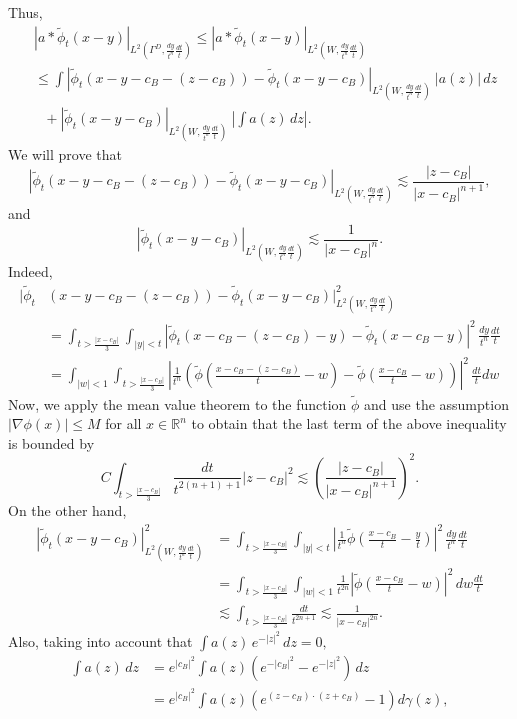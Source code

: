 \documentclass[leqno,11pt]{amsart}
\theoremstyle{plain}
\theoremstyle{remark}
\begin{document}
{{Thus,
\begin{align*}
&|a\ast \widetilde{\phi}_t(x-y)|_{L^2(\Gamma^D, \frac{dy}{t^n}\frac{dt}{t})} \le |a\ast \widetilde{\phi}_t(x-y)|_{L^2(W, \frac{dy}{t^n}\frac{dt}{t})}\\ & \le \int |\widetilde{\phi}_t(x-y-c_B-(z-c_B))-\widetilde{\phi}_t(x-y-c_B)|_{L^2(W, \frac{dy}{t^n}\frac{dt}{t})}\ |a(z)|\, dz\\ &\ \ \ + |\widetilde{\phi}_t(x-y-c_B)|_{L^2(W, \frac{dy}{t^n}\frac{dt}{t})}\ \left|\int a(z)\, dz\right|.
\end{align*}
We will prove that $$|\widetilde{\phi}_t(x-y-c_B-(z-c_B))-\widetilde{\phi}_t(x-y-c_B)|_{L^2(W, \frac{dy}{t^n}\frac{dt}{t})}\lesssim \frac{|z-c_B|}{|x-c_B|^{n+1}},$$ and $$|\widetilde{\phi}_t(x-y-c_B)|_{L^2(W, \frac{dy}{t^n}\frac{dt}{t})}\lesssim \frac{1}{|x-c_B|^n}.$$
Indeed,
\begin{align*}
|\widetilde{\phi}_t&(x-y-c_B-(z-c_B))-\widetilde{\phi}_t(x-y-c_B)|^2_{L^2(W, \frac{dy}{t^n}\frac{dt}{t})}\\ &=\int_{t>\frac{|x-c_B|}{3}}\int_{|y|<t}|\widetilde{\phi}_t(x-c_B-(z-c_B)-y)-\widetilde{\phi}_t(x-c_B-y)|^2\, \frac{dy}{t^n}\frac{dt}{t}\\ &=\int_{|w|<1}\int_{t>\frac{|x-c_B|}{3}} \left|\frac{1}{t^n}\left(\widetilde{\phi}\left(\frac{x-c_B-(z-c_B)}{t}-w\right)-\widetilde{\phi}\left(\frac{x-c_B}{t}-w\right)\right)\right|^2\, \frac{dt}{t}dw
\end{align*}
Now, we apply the mean value theorem to the function $\widetilde{\phi}$ and use the assumption $|\nabla \phi(x)|\le M$ for all $x\in \mathbb{R}^n$ to obtain that the last term of the above inequality is bounded by
$$C \int_{t>\frac{|x-c_B|}{3}}\frac{dt}{t^{2(n+1)+1}}|z-c_B|^2\lesssim \left(\frac{|z-c_B|}{|x-c_B|^{n+1}}\right)^2.$$
On the other hand,
\begin{align*}|\widetilde{\phi}_t(x-y-c_B)|^2_{L^2(W, \frac{dy}{t^n}\frac{dt}{t})}&=\int_{t>\frac{|x-c_B|}{3}}\int_{|y|<t}\left|\frac{1}{t^n}\widetilde{\phi}\left(\frac{x-c_B}{t}-\frac{y}{t}\right)\right|^2\, \frac{dy}{t^n}\frac{dt}{t}\\&=\int_{t>\frac{|x-c_B|}{3}}\int_{|w|<1}\frac{1}{t^{2n}}\left|\widetilde{\phi}\left(\frac{x-c_B}{t}-w\right)\right|^2\, dw\frac{dt}{t}\\ &\lesssim \int_{t>\frac{|x-c_B|}{3}}\frac{dt}{t^{2n+1}}\lesssim \frac{1}{|x-c_B|^{2n}}. \end{align*}
Also, taking into account that $\int a(z)\, e^{-|z|^2}\, dz=0,$\begin{align*}
\int a(z)\, dz&= e^{|c_B|^2}\int a(z)(e^{-|c_B|^2}-e^{-|z|^2})\, dz\\ & = e^{|c_B|^2}\int a(z) (e^{(z-c_B)\cdot(z+c_B)}-1)d\gamma(z),

\end{align*}}}
\end{document}
